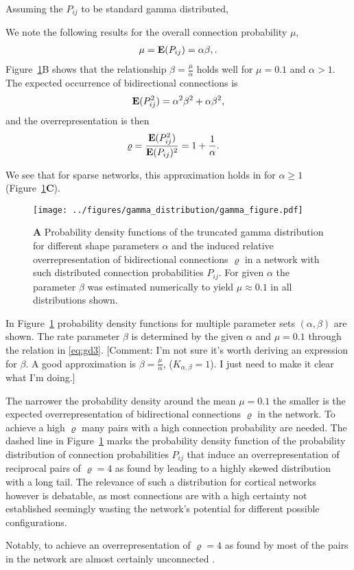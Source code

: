 Assuming the $P_{ij}$ to be standard gamma distributed, 

We note the following results for the overall connection probability $\mu$,
%
\begin{align}
 \mu = \operatorname{\mathbf{E}}(P_{ij}) = \alpha \beta, \label{eq:gd3}.
\end{align}
Figure~\ref{fig:gd}B shows that the relationship $\beta = \frac{\mu}{\alpha}$ holds well for $\mu = 0.1$ and $\alpha > 1$. The expected occurrence of bidirectional connections is 
\begin{align}
  \operatorname{\mathbf{E}}(P_{ij}^2) = \alpha^2 \beta^2 + \alpha \beta^2,
\end{align}
%
and the overrepresentation is then
\begin{align}
  \varrho & = \frac{\E(P_{ij}^2)}{\E(P_{ij})^2} =%
 1 + \frac{1}{\alpha}.
\end{align}

We see that for sparse networks, this approximation holds in for $\alpha \geq 1$ (Figure~\ref{fig:gd}\textbf{C}).

\begin{figure}[h!]
\centering
\texttt{[image: ../figures/gamma\_distribution/gamma\_figure.pdf]}
\caption{\textbf{A} Probability density functions of the truncated gamma distribution for different shape parameters $\alpha$ and the induced relative overrepresentation of bidirectional connections $\varrho$ in a network with such distributed connection probabilities $P_{ij}$. For given $\alpha$ the parameter $\beta$ was estimated numerically to yield $\mu \approx 0.1$ in all distributions shown.}
\label{fig:gd}
\end{figure}

In Figure~\ref{fig:gd} probability density functions for multiple parameter sets $(\alpha, \beta)$ are shown. The rate parameter $\beta$ is determined by the given $\alpha$ and $\mu = 0.1$ through the relation in \eqref{eq:gd3}. [Comment: I'm not sure it's worth deriving an expression for $\beta$. A good approximation is $\beta = \frac{\mu}{\alpha}$, ($K_{\alpha,\beta} = 1$). I just need to make it clear what I'm doing.]

The narrower the probability density around the mean $\mu = 0.1$ the smaller is the expected overrepresentation of bidirectional connections $\varrho$ in the network. To achieve a high $\varrho$ many pairs with a high connection probability are needed. The dashed line in Figure~\ref{fig:gd} marks the probability density function of the probability distribution of connection probabilities $P_{ij}$ that induce an overrepresentation of reciprocal pairs of $\varrho = 4$ as found by \textcite{Song2005} leading to a highly skewed distribution with a long tail. The relevance of such a distribution for cortical networks however is debatable, as most connections are with a high certainty not established seemingly wasting the network's potential for different possible configurations.


Notably, to achieve an overrepresentation of $\varrho = 4$ as found by \textcite{Song2005} most of the pairs in the network are almost certainly unconnected .



